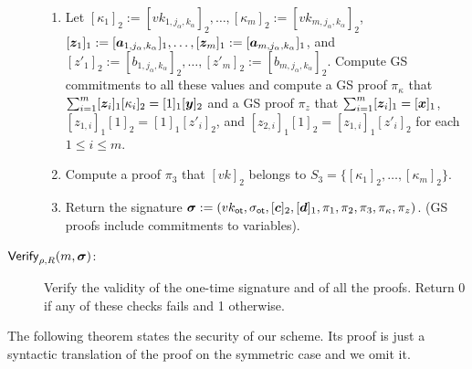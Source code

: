 \begin{description}
\begin{enumerate}
\item Let $[\kappa_1]_2:=[vk_{1,j_\alpha,k_\alpha}]_2,\ldots,[\kappa_m]_2:=[vk_{m,j_\alpha,k_\alpha}]_2$, $[{\boldsymbol{z}}_1]_1:=\allowbreak[{\boldsymbol{a}}_{1,j_\alpha,k_\alpha}]_1,\allowbreak\ldots,[{\boldsymbol{z}}_m]_1:=[{\boldsymbol{a}}_{m,j_\alpha,k_\alpha}]_1$, and $[z'_1]_2:=[b_{1,j_\alpha,k_\alpha}]_2,\ldots,[z'_m]_2:=[b_{m,j_\alpha,k_\alpha}]_2$. Compute GS commitments to all these values and compute a GS proof $\pi_\kappa$ that $\sum_{i=1}^{m}[{\boldsymbol{z}}_i]_1[\kappa_i]_2=[1]_1[{\boldsymbol{y}}]_2$ and a GS proof $\pi_{z}$ that $\sum_{i=1}^{m}[{\boldsymbol{z}}_i]_1=[{\boldsymbol{x}}]_1$,  $[z_{1,i}]_1[1]_2 = [1]_1[z'_i]_2$, and $[z_{2,i}]_1[1]_2=[z_{1,i}]_1[z'_{i}]_2$ for each $1\leq i\leq m$.
\item Compute a proof $\pi_3$ that $[vk]_2$ belongs to $S_3=\{[\kappa_1]_2,\ldots,[\kappa_m]_2\}$.
\item Return the signature ${\boldsymbol \sigma}:=(vk_\mathsf{ot},\sigma_\mathsf{ot},[{\boldsymbol{c}}]_2,[{\boldsymbol{d}}]_1,\pi_1,\pi_2,\pi_3,\pi_\kappa,\pi_z)$. (GS proofs include commitments to variables).
\end{enumerate}
\item[$\mathsf{Verify}_{\rho,R}(m,{\boldsymbol \sigma})$:] Verify the validity of the one-time signature and of all the proofs. Return 0 if any of these checks fails and 1 otherwise.
\end{description}

The following theorem states the security of our scheme. Its proof is just a syntactic translation of the proof on the symmetric case and we omit it.

